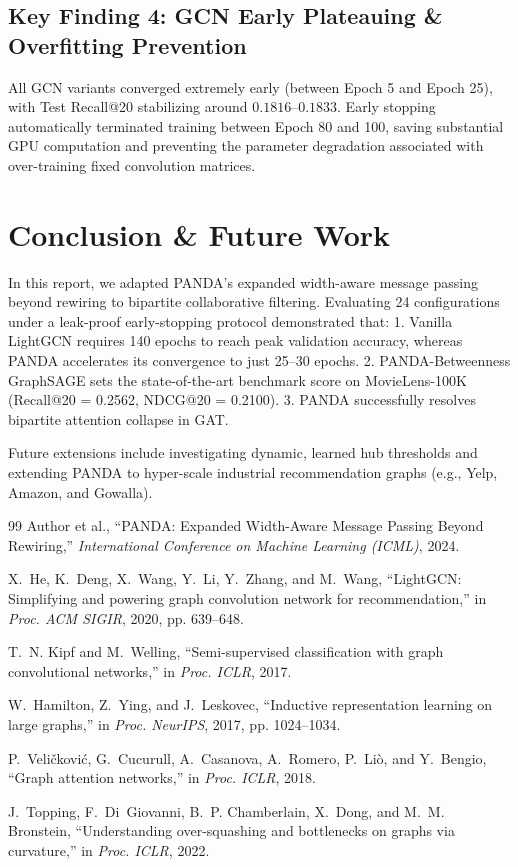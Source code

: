 \documentclass[11pt,a4paper]{article}
\begin{document}
\subsection{Key Finding 4: GCN Early Plateauing \& Overfitting Prevention}
All GCN variants converged extremely early (between Epoch 5 and Epoch 25), with Test Recall@20 stabilizing around $0.1816$--$0.1833$. Early stopping automatically terminated training between Epoch 80 and 100, saving substantial GPU computation and preventing the parameter degradation associated with over-training fixed convolution matrices.

\section{Conclusion \& Future Work}
In this report, we adapted PANDA's expanded width-aware message passing beyond rewiring to bipartite collaborative filtering. Evaluating 24 configurations under a leak-proof early-stopping protocol demonstrated that:
1. Vanilla LightGCN requires 140 epochs to reach peak validation accuracy, whereas PANDA accelerates its convergence to just 25--30 epochs.
2. PANDA-Betweenness GraphSAGE sets the state-of-the-art benchmark score on MovieLens-100K (Recall@20 = 0.2562, NDCG@20 = 0.2100).
3. PANDA successfully resolves bipartite attention collapse in GAT.

Future extensions include investigating dynamic, learned hub thresholds and extending PANDA to hyper-scale industrial recommendation graphs (e.g., Yelp, Amazon, and Gowalla).

\begin{thebibliography}{99}
Author et al., ``PANDA: Expanded Width-Aware Message Passing Beyond Rewiring,'' \textit{International Conference on Machine Learning (ICML)}, 2024.

X.~He, K.~Deng, X.~Wang, Y.~Li, Y.~Zhang, and M.~Wang, ``LightGCN: Simplifying and powering graph convolution network for recommendation,'' in \textit{Proc. ACM SIGIR}, 2020, pp. 639--648.

T.~N. Kipf and M.~Welling, ``Semi-supervised classification with graph convolutional networks,'' in \textit{Proc. ICLR}, 2017.

W.~Hamilton, Z.~Ying, and J.~Leskovec, ``Inductive representation learning on large graphs,'' in \textit{Proc. NeurIPS}, 2017, pp. 1024--1034.

P.~Veli{\v{c}}kovi{\'c}, G.~Cucurull, A.~Casanova, A.~Romero, P.~Li{\`o}, and Y.~Bengio, ``Graph attention networks,'' in \textit{Proc. ICLR}, 2018.

J.~Topping, F.~Di~Giovanni, B.~P. Chamberlain, X.~Dong, and M.~M. Bronstein, ``Understanding over-squashing and bottlenecks on graphs via curvature,'' in \textit{Proc. ICLR}, 2022.
\end{thebibliography}
\end{document}
